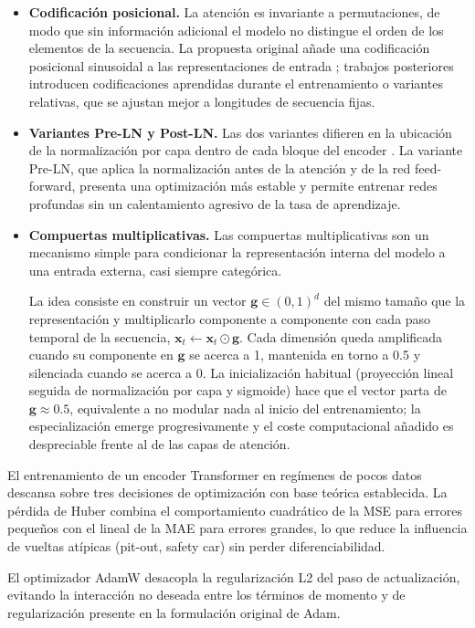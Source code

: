 \begin{itemize}
    \item \textbf{Codificación posicional.} La atención es invariante a permutaciones, de modo que sin información adicional el modelo no distingue el orden de los elementos de la secuencia. La propuesta original añade una codificación posicional sinusoidal a las representaciones de entrada \cite{vaswani2017attention}; trabajos posteriores introducen codificaciones aprendidas durante el entrenamiento o variantes relativas, que se ajustan mejor a longitudes de secuencia fijas.
    \item \textbf{Variantes Pre-LN y Post-LN.} Las dos variantes difieren en la ubicación de la normalización por capa dentro de cada bloque del encoder \cite{xiong2020layernorm}. La variante Pre-LN, que aplica la normalización antes de la atención y de la red feed-forward, presenta una optimización más estable y permite entrenar redes profundas sin un calentamiento agresivo de la tasa de aprendizaje.
    \item \textbf{Compuertas multiplicativas.} Las compuertas multiplicativas son un mecanismo simple para condicionar la representación interna del modelo a una entrada externa, casi siempre categórica. 
    
    La idea consiste en construir un vector $\mathbf{g} \in (0,1)^d$ del mismo tamaño que la representación y multiplicarlo componente a componente con cada paso temporal de la secuencia, $\mathbf{x}_t \leftarrow \mathbf{x}_t \odot \mathbf{g}$. Cada dimensión queda amplificada cuando su componente en $\mathbf{g}$ se acerca a 1, mantenida en torno a 0.5 y silenciada cuando se acerca a 0. La inicialización habitual (proyección lineal seguida de normalización por capa y sigmoide) hace que el vector parta de $\mathbf{g} \approx 0.5$, equivalente a no modular nada al inicio del entrenamiento; la especialización emerge progresivamente y el coste computacional añadido es despreciable frente al de las capas de atención.
\end{itemize}

El entrenamiento de un encoder Transformer en regímenes de pocos datos descansa sobre tres decisiones de optimización con base teórica establecida. La pérdida de Huber \cite{wikipediahuberloss} combina el comportamiento cuadrático de la MSE para errores pequeños con el lineal de la MAE para errores grandes, lo que reduce la influencia de vueltas atípicas (pit-out, safety car) sin perder diferenciabilidad. 

El optimizador AdamW \cite{cornelladamw} desacopla la regularización L2 del paso de actualización, evitando la interacción no deseada entre los términos de momento y de regularización presente en la formulación original de Adam. 

